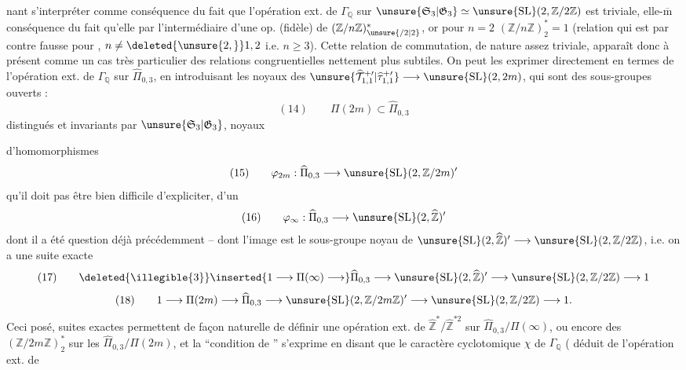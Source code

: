 nant s'interpréter comme conséquence du fait que l'opération ext. de $\Gamma_{\mathbb Q}$ sur $\unsure{\mathfrak S_3|\mathfrak G_3}\simeq \unsure{\mathrm{SL}}(2,\mathbb Z/2\mathbb Z)$ est triviale, elle-$\overline{\mathrm m}$  conséquence du fait qu'elle  par l'intermédiaire d'une op. (fidèle) de $(\mathbb Z/n\mathbb Z)^*_{\unsure{/2|2}}$, or pour $n=2$ $(\mathbb Z/n\mathbb Z)^*_2=1$ (relation qui est par contre fausse pour   , $n\neq\deleted{\unsure{2,}}1,2$ i.e. $n\geq3$). Cette relation de commutation, de nature assez triviale, apparaît donc à présent comme un cas très particulier des relations congruentielles nettement plus subtiles. On peut  les exprimer   directement en termes de l'opération ext. de $\Gamma_{\mathbb Q}$ sur $\widehat\Pi_{0,3}$, en introduisant les noyaux des  $\unsure{\widehat{\mathcal T}_{1,1}^{+\prime}|\widehat\tau_{1,1}^{+\prime}}\longrightarrow \unsure{\mathrm{SL}}(2,2m)$, qui sont des sous-groupes  ouverts :
\[
(14)\qquad \Pi(2m)\subset\widehat\Pi_{0,3}
\]
distingués et invariants par $\unsure{\mathfrak S_3|\mathfrak G_3}$, noyaux

d'homomorphismes
\[
(15)\qquad \varphi_{2m}:\widehat\Pi_{0,3}\longrightarrow\unsure{\mathrm{SL}}(2,\mathbb Z/2m)'
\]
qu'il  doit pas être bien difficile d'expliciter,   d'un 
\[
(16)\qquad \varphi_{\infty}:\widehat\Pi_{0,3}\longrightarrow\unsure{\mathrm{SL}}(2,\widehat{\mathbb Z})'
\]
dont il a été question déjà précédemment --  dont l'image est le sous-groupe noyau de $\unsure{\mathrm{SL}}(2,\widehat{\mathbb Z})'\longrightarrow\unsure{\mathrm{SL}}(2,\mathbb Z/2\mathbb Z)$, i.e. on a une suite exacte
\[
(17)\qquad \deleted{\illegible{3}}\inserted{1\longrightarrow\Pi(\infty)\longrightarrow}\widehat\Pi_{0,3}\longrightarrow\unsure{\mathrm{SL}}(2,\widehat{\mathbb Z})'\longrightarrow\unsure{\mathrm{SL}}(2,\mathbb Z/2\mathbb Z)\longrightarrow1
\]
\[
(18)\qquad 1\longrightarrow\Pi(2m)\longrightarrow\widehat\Pi_{0,3}\longrightarrow\unsure{\mathrm{SL}}(2,\mathbb Z/2m\mathbb Z)'\longrightarrow\unsure{\mathrm{SL}}(2,\mathbb Z/2\mathbb Z)\longrightarrow1.
\]
Ceci posé,  suites exactes permettent de façon naturelle de définir une opération ext. de $\widehat{\mathbb Z}^{*}/\widehat{\mathbb Z}^{*2}$ sur $\widehat\Pi_{0,3}/\Pi(\infty)$, ou encore des $(\mathbb Z/2m\mathbb Z)^*_2$ sur les $\widehat\Pi_{0,3}/\Pi(2m)$, et la ``condition de '' s'exprime en disant que le caractère cyclotomique $\chi$ de $\Gamma_{\mathbb Q}$ ( déduit de l'opération ext. de

